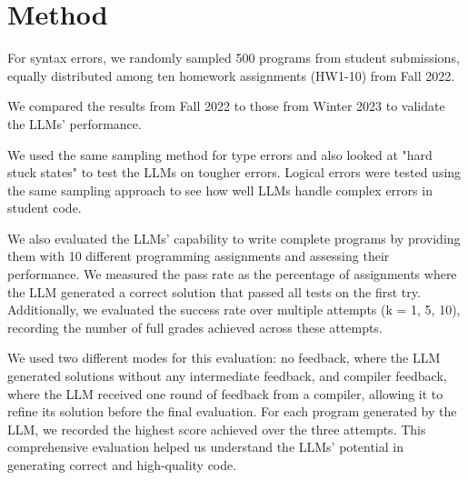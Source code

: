 \documentclass[sigconf,authordraft]{acmart}
\begin{document}
\section{Method}




For syntax errors, we randomly sampled 500 programs from student submissions, equally distributed among ten homework assignments (HW1-10) from Fall 2022. 


We compared the results from Fall 2022 to those from Winter 2023 to validate the LLMs' performance.

We used the same sampling method for type errors and also looked at "hard stuck states" to test the LLMs on tougher errors. Logical errors were tested using the same sampling approach to see how well LLMs handle complex errors in student code.

We also evaluated the LLMs' capability to write complete programs by providing them with 10 different programming assignments and assessing their performance. We measured the pass rate as the percentage of assignments where the LLM generated a correct solution that passed all tests on the first try. Additionally, we evaluated the success rate over multiple attempts (k = 1, 5, 10), recording the number of full grades achieved across these attempts.

We used two different modes for this evaluation: no feedback, where the LLM generated solutions without any intermediate feedback, and compiler feedback, where the LLM received one round of feedback from a compiler, allowing it to refine its solution before the final evaluation. For each program generated by the LLM, we recorded the highest score achieved over the three attempts. This comprehensive evaluation helped us understand the LLMs' potential in generating correct and high-quality code.
\end{document}
